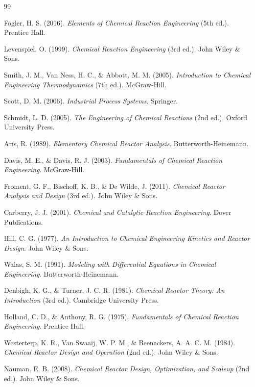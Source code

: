 \documentclass[11pt,a4paper]{article}
\begin{document}
\begin{thebibliography}{99}

Fogler, H. S. (2016). \textit{Elements of Chemical Reaction Engineering} (5th ed.). Prentice Hall.

Levenspiel, O. (1999). \textit{Chemical Reaction Engineering} (3rd ed.). John Wiley \& Sons.

Smith, J. M., Van Ness, H. C., \& Abbott, M. M. (2005). \textit{Introduction to Chemical Engineering Thermodynamics} (7th ed.). McGraw-Hill.

Scott, D. M. (2006). \textit{Industrial Process Systems}. Springer.

Schmidt, L. D. (2005). \textit{The Engineering of Chemical Reactions} (2nd ed.). Oxford University Press.

Aris, R. (1989). \textit{Elementary Chemical Reactor Analysis}. Butterworth-Heinemann.

Davis, M. E., \& Davis, R. J. (2003). \textit{Fundamentals of Chemical Reaction Engineering}. McGraw-Hill.

Froment, G. F., Bischoff, K. B., \& De Wilde, J. (2011). \textit{Chemical Reactor Analysis and Design} (3rd ed.). John Wiley \& Sons.

Carberry, J. J. (2001). \textit{Chemical and Catalytic Reaction Engineering}. Dover Publications.

Hill, C. G. (1977). \textit{An Introduction to Chemical Engineering Kinetics and Reactor Design}. John Wiley \& Sons.

Walas, S. M. (1991). \textit{Modeling with Differential Equations in Chemical Engineering}. Butterworth-Heinemann.

Denbigh, K. G., \& Turner, J. C. R. (1981). \textit{Chemical Reactor Theory: An Introduction} (3rd ed.). Cambridge University Press.

Holland, C. D., \& Anthony, R. G. (1975). \textit{Fundamentals of Chemical Reaction Engineering}. Prentice Hall.

Westerterp, K. R., Van Swaaij, W. P. M., \& Beenackers, A. A. C. M. (1984). \textit{Chemical Reactor Design and Operation} (2nd ed.). John Wiley \& Sons.

Nauman, E. B. (2008). \textit{Chemical Reactor Design, Optimization, and Scaleup} (2nd ed.). John Wiley \& Sons.


\end{thebibliography}
\end{document}
